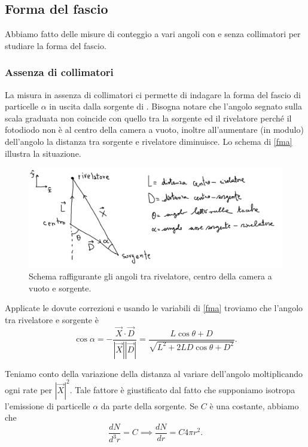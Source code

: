 \subsection{Forma del fascio}
\label{sec:forma}

Abbiamo fatto delle misure di conteggio a vari angoli con e senza collimatori per studiare la forma del fascio.

\subsubsection{Assenza di collimatori}

La misura in assenza di collimatori ci permette di indagare la forma del fascio di particelle $\alpha$ in uscita dalla sorgente di \am{}.
Bisogna notare che l'angolo segnato sulla scala graduata non coincide con quello tra la sorgente ed il rivelatore perché il fotodiodo non è al centro della camera a vuoto, inoltre all'aumentare (in modulo) dell'angolo la distanza tra sorgente e rivelatore diminuisce. 
Lo schema di \autoref{fma} illustra la situazione.

\begin{figure}[h]
\centering
\includegraphics[width=30 em]{immagini/fma_provv}
\caption{Schema raffigurante gli angoli tra rivelatore, centro della camera a vuoto e sorgente.}
\label{fma}
\end{figure}

Applicate le dovute correzioni e usando le variabili di \autoref{fma} troviamo che l'angolo tra rivelatore e sorgente è
\begin{equation}
\cos{\alpha}= -\frac{\vec{X} \cdot \vec{D} }{ |\vec{X}| |\vec{D}| } = \frac{ L \cos{\theta} + D }{ \sqrt{ L^2+2LD\cos{\theta}+D^2  } }.
\end{equation}

Teniamo conto della variazione della distanza al variare dell'angolo moltiplicando ogni rate per $|\vec{X}|^2$.
Tale fattore è giustificato dal fatto che supponiamo isotropa l'emissione di particelle $\alpha$ da parte della sorgente.
Se $C$ è una costante, abbiamo che $$ \frac{dN}{d^3r}=C \implies \frac{dN}{dr}=C 4\pi r^2. $$

